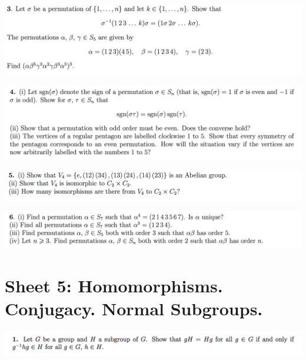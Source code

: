 \documentclass[12pt]{article}
\begin{document}
\newpage
\begin{mdframed}
\includegraphics[width=400pt]{img/oxford-prelims-M1-groups-2-3.png}
\end{mdframed}

\newpage
\begin{mdframed}
\includegraphics[width=400pt]{img/oxford-prelims-M1-groups-2-4.png}
\end{mdframed}

\begin{mdframed}
\includegraphics[width=400pt]{img/oxford-prelims-M1-groups-2-5.png}
\end{mdframed}

\begin{mdframed}
\includegraphics[width=400pt]{img/oxford-prelims-M1-groups-2-6.png}
\end{mdframed}

\section{Sheet 5: Homomorphisms. Conjugacy. Normal Subgroups.}

\begin{mdframed}
\includegraphics[width=400pt]{img/abstract-algebra-oxford-M1-5-1.png}
\end{mdframed}
\end{document}
